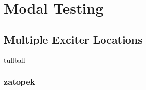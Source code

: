 \documentclass[aspectratio=169,10pt]{beamer} \mode<presentation>
\newcommand{\R}{\mathbb{R}}
\DeclareMathOperator*{\argmin}{arg\,min}
\begin{document}





\section{Modal Testing}
\subsection{Multiple Exciter Locations}

\begin{frame}{tullball}
  \frametitle{zatopek}
  
\end{frame}
\end{document}
